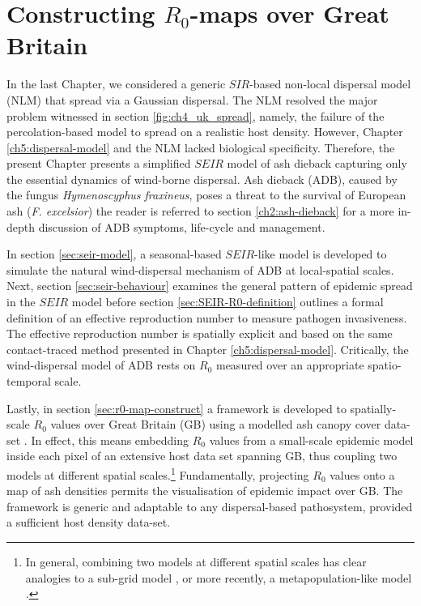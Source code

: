 \chapter{Constructing $R_0$-maps over Great Britain}
\label{ch:6-adb}

In the last Chapter, we considered a generic $SIR$-based non-local dispersal model (NLM) that spread via a Gaussian dispersal. 
The NLM resolved the major problem witnessed in section \ref{fig:ch4_uk_spread}, 
namely, the failure of the percolation-based model to spread on a realistic host density. 
However, Chapter \ref{ch5:dispersal-model} and the NLM lacked biological specificity. 
Therefore, the present Chapter presents a simplified $SEIR$ model of ash dieback capturing only the essential dynamics of wind-borne dispersal.
Ash dieback (ADB), caused by the fungus \textit{Hymenoscyphus fraxineus}, poses a threat to the survival of European ash (\textit{F. excelsior})\textemdash
the reader is referred to section \ref{ch2:ash-dieback} for a more in-depth discussion of ADB symptoms, life-cycle and management.

In section \ref{sec:seir-model}, a seasonal-based $SEIR$-like model is developed to simulate the natural wind-dispersal mechanism of ADB at local-spatial scales. 
Next, section \ref{sec:seir-behaviour} examines the general pattern of epidemic spread in the $SEIR$ model before section \ref{sec:SEIR-R0-definition} 
outlines a formal definition of an effective reproduction number to measure pathogen invasiveness. 
The effective reproduction number is spatially explicit and based on the same contact-traced method presented in Chapter \ref{ch5:dispersal-model}.
Critically, the wind-dispersal model of ADB rests on $R_0$ measured over an appropriate spatio-temporal scale.

Lastly, in section \ref{sec:r0-map-construct} a framework is developed to spatially-scale $R_0$ values over Great Britain (GB) using a modelled ash canopy cover data-set \cite{hill.data}. 
In effect, this means embedding $R_0$ values from a small-scale epidemic model inside each pixel of an extensive host data set spanning GB, 
thus coupling two models at different spatial scales.\footnote{In general, combining two models at different spatial scales has clear analogies to a 
sub-grid model \cite{sub-grid}, or more recently, a metapopulation-like model \cite{GRENFELL1997395}.} 
Fundamentally, projecting $R_0$ values onto a map of ash densities permits the visualisation of epidemic impact over GB.
The framework is generic and adaptable to any dispersal-based pathosystem, provided a sufficient host density data-set.


